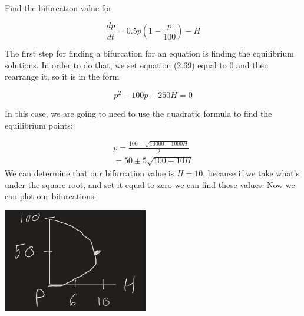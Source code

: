   \begin{problem}
    Find the bifurcation value for 

    \begin{equation}
      \frac{dp}{dt}=0.5p\left(1-\frac{p}{100}\right)-H
    \end{equation}

    The first step for finding a bifurcation for an equation is finding the equilibrium solutions. In order to do that, we set equation (2.69) equal to 0 and then rearrange it, so it is in the form

    \begin{equation}
      p^2-100p+250H=0
    \end{equation}

    In this case, we are going to need to use the quadratic formula to find the equilibrium points:

    \begin{align}
      p=\frac{100\pm\sqrt{10000-1000H}}{2}\\
      =50\pm5\sqrt{100-10H}
    \end{align}
    We can determine that our bifurcation value is $H=10$, because if we take what's under the square root, and set it equal to zero we can find those values.
    Now we can plot our bifurcations:
    \begin{center}
      \includegraphics{resource/images/2.7 Example 3 1.jpg}
    \end{center}
  \end{problem}
